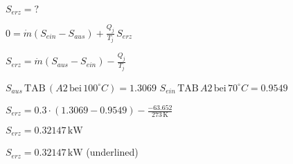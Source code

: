 \( S_{erz} = ? \)  

\( 0 = \dot{m} (S_{ein} - S_{aus}) + \frac{Q_{j}}{T_j} \, S_{erz} \)  

\( S_{erz} = \dot{m} (S_{aus} - S_{ein}) - \frac{Q_{j}}{T_j} \)  

\( S_{aus} \, \text{TAB} \, (A2 \, \text{bei} \, 100^\circ C) = 1.3069 \)  
\( S_{ein} \, \text{TAB} \, A2 \, \text{bei} \, 70^\circ C = 0.9549 \)  

\( S_{erz} = 0.3 \cdot (1.3069 - 0.9549) - \frac{-63.652}{273 \, \text{K}} \)  

\( S_{erz} = 0.32147 \, \text{kW} \)  

\( S_{erz} = 0.32147 \, \text{kW} \) (underlined)